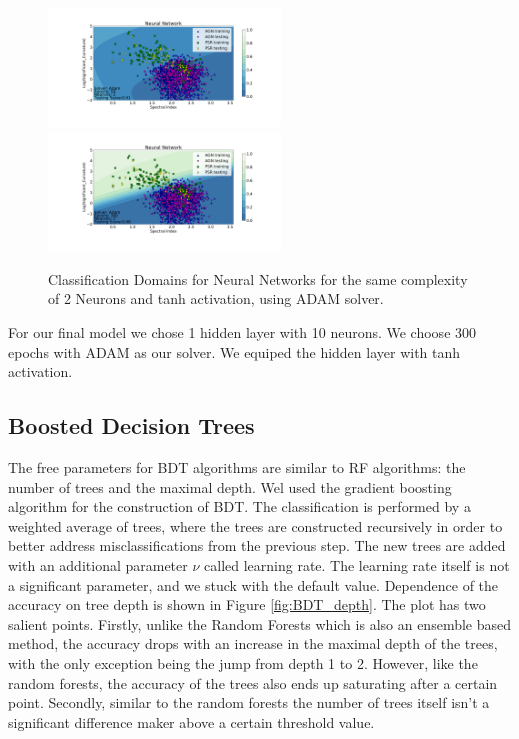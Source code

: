 \begin{figure}[h]
\hspace*{-1cm}
\includegraphics[width=0.55\textwidth]{plots/classification_domains/nn_adam_10_tanh_50_final.pdf}
\hspace*{-1cm}
\includegraphics[width=0.55\textwidth]{plots/classification_domains/nn_adam_10_tanh_300_final.pdf}
\caption{Classification Domains for Neural Networks for the same complexity of 2 Neurons and tanh activation, using ADAM solver. }
\label{fig:NN_domains}
\end{figure}

For our final model we chose 1 hidden layer with 10 neurons. We choose 300 epochs with ADAM as our solver. We equiped the hidden layer with tanh activation.
\subsection{Boosted Decision Trees}

The free parameters for BDT algorithms are similar to RF algorithms: the number of trees and the maximal depth.
Wel used the gradient boosting algorithm for the construction of BDT.
The classification is performed by a weighted average of trees, where the trees are constructed recursively in order to better address 
misclassifications from the previous step. The new trees are added with an additional parameter $\nu$ called learning rate. The learning rate itself is not a significant parameter, and we stuck with the default value.
Dependence of the accuracy on tree depth is shown in Figure \ref{fig:BDT_depth}. The plot has two salient points. Firstly, unlike the Random Forests which is also an ensemble based method, the accuracy drops with an increase in the maximal depth of the trees, with the only exception being the jump from depth 1 to 2. However, like the random forests, the accuracy of the trees also ends up saturating after a certain point. Secondly, similar to the random forests the number of trees itself isn't a significant difference maker above a certain threshold value. 

